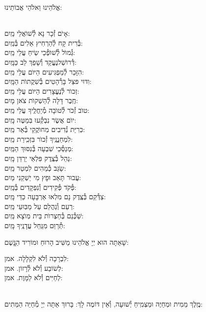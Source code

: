 \documentclass[twoside, openany, parskip=half, 11pt]{book}
\begin{document}
\begin{small}אֱלֹהֵינוּ וֵאלֹהֵי אֲבוֹתֵינוּ:\end{small}\\
אָיׂם זְ֯כָר נָא לְ֯שׁוׂאֲלֵי \hfill מַֽיִם:\\
בְּ֯רִית קָח לְ֯הַרְחִיץ אֵלִים \hfill בְּ֯מַֽיִם:\\
גְּ֯מוׂל לְ֯שׁוׂפְ֯כֵי שִֹֽיחַ עֲלֵי \hfill מַֽיִם:\\
דְּ֯רוׂשְׁלנֶעֱקַד וְ֯שָׁפַךְ לֵב \hfill כַּמָּֽיִם:\\
הִזָּכֵר לְ֯מַפְגִּיעִים הַיּוׂם עֲלֵי \hfill מַֽיִם:\\
וִדּוּי פּצֵּל בָּרְ֯הָטִים בְּ֯שִׁקֲתוׂת \hfill הַמָּֽיִם:\\
זְכוׂר לְ֯נֶעֱצָרִים הַיּוׂם עֲלֵי \hfill מַֽיִם:\\
חֶֽבֶר דָּלָה לְ֯הַשְׁקוׂת צׂאן \hfill מָיִם:\\
טוׂב זְ֯כׂר לְ֯טוׂבָה מְ֯יַחֲלֶֽיךָ עֲלֵי \hfill מַֽיִם:\\
יוׂם אֲשֶׂר נִבְקְ֯עוּ בּֽמַטֶּה \hfill מָֽיִם:\\
כּֽרִיַּת נְ֯דִיבִים מֽחוׂקֲקֵי בְּ֯אֵר \hfill מַֽיִם:\\
לִמְחַנֲנֶֽיךָ זְ֯כוׂר בִּזְכִֽירַת \hfill מַֽיִם:\\
מְנַסְּ֯כֵי שִׁבְעָה בְּ֯נִסּוּךְ \hfill הַמַּֽיִם:\\
נַהֵל בְּ֯צֶֽדֶק פִּלְאֵי יַרְדֵּן \hfill מָֽיִם:\\
שַֹגֵּב כְּ֯מֵהִים לִמְטַר \hfill מַֽיִם:\\
עֲבוּר תָּאַב וּפָץ מִי יַשְׁקֵנִי \hfill מַיִם:\\
פְּ֯קׂד פְּ֯קִידִים וְ֯נִפְקָדִים \hfill בְּ֯מַֽיִם:\\
צַדְּ֯קֵם בְּ֯צֶֽדֶק נָם מִלְאוּ אַרְבָּעָה כַדֵּי \hfill מָֽיִם:\\
רְעֵם וְ֯נַהֲלֵם עַל מַבּֽוּעֵי \hfill מַֽיִם:\\
שַׁכְּ֯נֵם בְּ֯חַצְרוׂת בֵּית מֽוׂצָא \hfill מַֽיִם:\\
תְּ֯רַוֵּם מִנַּֽחַל עֲדָנֶֽיךָ \hfill מָֽיִם:

שָׁאַתָּה הוּא יְיָ אֱלֹהֵינוּ מַשִּׁיב הָרוּחַ וּמוֹרִיד הַגֱּֽשֶׁם:

לִבְרָכָה וְ֯לֹא לִקְלָלָה. \hfill אמן:\\
לְשׂוֹבַע וְ֯לֹא לְ֯רָזוֹן. \hfill אמן:\\
לְחַיִּים וְ֯לֹא לַמָּוֶת. \hfill אמן:

\\
מֶֽלֶךְ מֵמִית וּמְחַיֶּה וּמַצְמִֽיחַ יְ֯שׁוּעָה, וְ֯אֵין דּוֹמֶה לָךְ: בָּרוּךְ אַתָּה יְיָ מְ֯חַיֵּה הַמֵּתִים:
\end{document}
